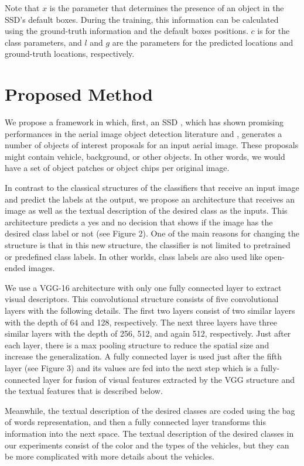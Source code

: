 \documentclass[conference]{IEEEtran}
\begin{document}
Note that $x$ is the parameter that determines the presence of an object in the SSD's default boxes. During the training, this information can be calculated using the ground-truth information and the default boxes positions. $c$ is for the class parameters, and $l$ and $g$ are the parameters for the predicted locations and ground-truth locations, respectively.\\


\section{Proposed Method}

We propose a framework in which, first, an SSD \cite{ssd}, which has shown promising performances in the aerial image object detection literature \cite{fusion} and \cite{okutama}, generates a number of objects of interest proposals for an input aerial image. These proposals might contain vehicle, background, or other objects. In other words, we would have a set of object patches or object chips per original image.

In contrast to the classical structures of the classifiers that receive an input image and predict the labels at the output, we propose an architecture that receives an image as well as the textual description of the desired class as the inputs. This architecture predicts a yes and no decision that shows if the image has the desired class label or not (see Figure 2). One of the main reasons for changing the structure is that in this new structure, the classifier is not limited to pretrained or predefined class labels. In other worlds, class labels are also used like open-ended images.

We use a VGG-16 architecture \cite{vgg} with only one fully connected layer to extract visual descriptors. This convolutional structure consists of five convolutional layers with the following details. The first two layers consist of two similar layers with the depth of 64 and 128, respectively. The next three layers have three similar layers with the depth of 256, 512, and again 512, respectively. Just after each layer, there is a max pooling structure to reduce the spatial size and increase the generalization. A fully connected layer is used just after the fifth layer (see Figure 3) and its values are fed into the next step which is a fully-connected layer for fusion of visual features extracted by the VGG structure and the textual features that is described below.

Meanwhile, the textual description of the desired classes are coded using the bag of words representation, and then a fully connected layer transforms this information into the next space. The textual description of the desired classes in our experiments consist of the color and the types of the vehicles, but they can be more complicated with more details about the vehicles.
\end{document}
